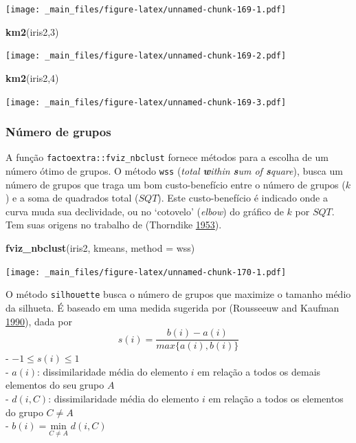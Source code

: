 \documentclass[
]{book}
\newenvironment{Shaded}{\begin{snugshade}}{\end{snugshade}}
\newcommand{\DataTypeTok}[1]{\textcolor[rgb]{0.13,0.29,0.53}{#1}}
\newcommand{\DecValTok}[1]{\textcolor[rgb]{0.00,0.00,0.81}{#1}}
\newcommand{\KeywordTok}[1]{\textcolor[rgb]{0.13,0.29,0.53}{\textbf{#1}}}
\newcommand{\NormalTok}[1]{#1}
\newcommand{\StringTok}[1]{\textcolor[rgb]{0.31,0.60,0.02}{#1}}
\theoremstyle{definition}
\theoremstyle{definition}
\theoremstyle{definition}
\theoremstyle{remark}
\begin{document}
\texttt{[image: \_main\_files/figure-latex/unnamed-chunk-169-1.pdf]}

\begin{Shaded}
\begin{Highlighting}[]
\KeywordTok{km2}\NormalTok{(iris2,}\DecValTok{3}\NormalTok{)}
\end{Highlighting}
\end{Shaded}

\texttt{[image: \_main\_files/figure-latex/unnamed-chunk-169-2.pdf]}

\begin{Shaded}
\begin{Highlighting}[]
\KeywordTok{km2}\NormalTok{(iris2,}\DecValTok{4}\NormalTok{)}
\end{Highlighting}
\end{Shaded}

\texttt{[image: \_main\_files/figure-latex/unnamed-chunk-169-3.pdf]}

\hypertarget{nuxfamero-de-grupos}{%
\subsubsection*{Número de grupos}\label{nuxfamero-de-grupos}}

A função \texttt{factoextra::fviz\_nbclust} fornece métodos para a escolha de um número ótimo de grupos. O método \texttt{wss} (\emph{total \textbf{w}ithin \textbf{s}um of \textbf{s}quare}), busca um número de grupos que traga um bom custo-benefício entre o número de grupos (\(k\)) e a soma de quadrados total (\(SQT\)). Este custo-benefício é indicado onde a curva muda sua declividade, ou no `cotovelo' (\emph{elbow}) do gráfico de \(k\) por \(SQT\). Tem suas origens no trabalho de (Thorndike \protect\hyperlink{ref-thorndike1953belongs}{1953}).

\begin{Shaded}
\begin{Highlighting}[]
\KeywordTok{fviz\_nbclust}\NormalTok{(iris2, kmeans, }\DataTypeTok{method =} \StringTok{\textquotesingle{}wss\textquotesingle{}}\NormalTok{)}
\end{Highlighting}
\end{Shaded}

\texttt{[image: \_main\_files/figure-latex/unnamed-chunk-170-1.pdf]}

O método \texttt{silhouette} busca o número de grupos que maximize o tamanho médio da silhueta. É baseado em uma medida sugerida por (Rousseeuw and Kaufman \protect\hyperlink{ref-rousseeuw1990finding}{1990}), dada por
\begin{equation}
s(i) = \dfrac{b(i)-a(i)}{max\{ a(i),b(i) \}}
\label{eq:silhueta}
\end{equation}
- \(-1 \le s(i) \le 1\)\\
- \(a(i)\): dissimilaridade média do elemento \(i\) em relação a todos os demais elementos do seu grupo \(A\)\\
- \(d(i,C)\): dissimilaridade média do elemento \(i\) em relação a todos os elementos do grupo \(C \ne A\)\\
- \(b(i) = \underset{C \ne A}{\mathrm{min}} \; d(i,C)\)
\end{document}
